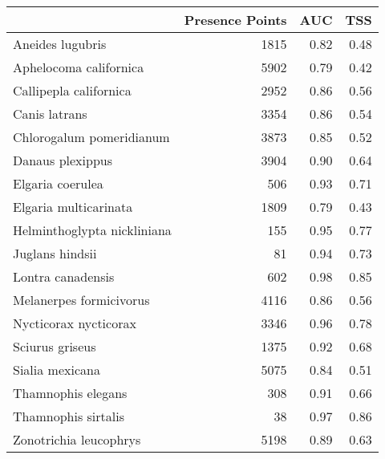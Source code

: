 \begin{longtable}{l|rrr}
\toprule
\multicolumn{1}{l}{} & Presence Points & AUC & TSS \\ 
\midrule
Aneides lugubris & 1815 & 0.82 & 0.48 \\ 
Aphelocoma californica & 5902 & 0.79 & 0.42 \\ 
Callipepla californica & 2952 & 0.86 & 0.56 \\ 
Canis latrans & 3354 & 0.86 & 0.54 \\ 
Chlorogalum pomeridianum & 3873 & 0.85 & 0.52 \\ 
Danaus plexippus & 3904 & 0.90 & 0.64 \\ 
Elgaria coerulea & 506 & 0.93 & 0.71 \\ 
Elgaria multicarinata & 1809 & 0.79 & 0.43 \\ 
Helminthoglypta nickliniana & 155 & 0.95 & 0.77 \\ 
Juglans hindsii & 81 & 0.94 & 0.73 \\ 
Lontra canadensis & 602 & 0.98 & 0.85 \\ 
Melanerpes formicivorus & 4116 & 0.86 & 0.56 \\ 
Nycticorax nycticorax & 3346 & 0.96 & 0.78 \\ 
Sciurus griseus & 1375 & 0.92 & 0.68 \\ 
Sialia mexicana & 5075 & 0.84 & 0.51 \\ 
Thamnophis elegans & 308 & 0.91 & 0.66 \\ 
Thamnophis sirtalis & 38 & 0.97 & 0.86 \\ 
Zonotrichia leucophrys & 5198 & 0.89 & 0.63 \\ 
\bottomrule
\end{longtable}

